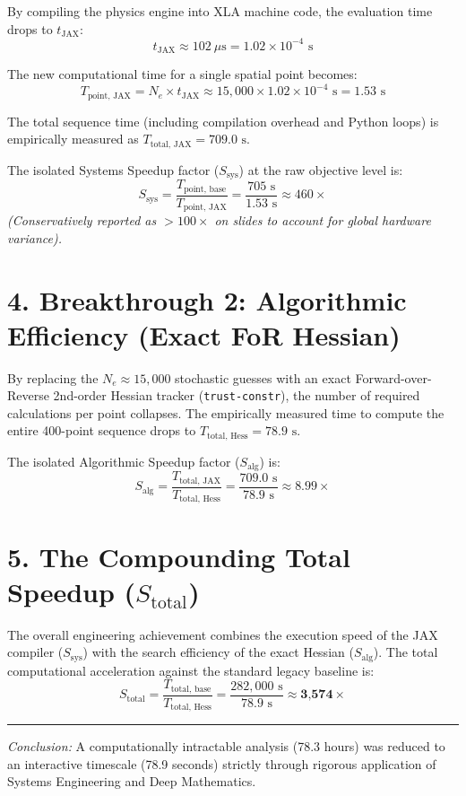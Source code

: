 \documentclass[11pt, letterpaper]{article}
\begin{document}
By compiling the physics engine into XLA machine code, the evaluation time drops to $t_{\text{JAX}}$:
\begin{equation}
t_{\text{JAX}} \approx 102 \ \mu\text{s} = 1.02 \times 10^{-4} \text{ s}
\end{equation}

The new computational time for a single spatial point becomes:
\begin{equation}
T_{\text{point, JAX}} = N_e \times t_{\text{JAX}} \approx 15,000 \times 1.02 \times 10^{-4} \text{ s} = 1.53 \text{ s}
\end{equation}

The total sequence time (including compilation overhead and Python loops) is empirically measured as $T_{\text{total, JAX}} = 709.0 \text{ s}$.

The isolated Systems Speedup factor ($S_{\text{sys}}$) at the raw objective level is:
\begin{equation}
S_{\text{sys}} = \frac{T_{\text{point, base}}}{T_{\text{point, JAX}}} = \frac{705 \text{ s}}{1.53 \text{ s}} \approx 460\times
\end{equation}
\textit{(Conservatively reported as $>100\times$ on slides to account for global hardware variance).}


\section*{4. Breakthrough 2: Algorithmic Efficiency (Exact FoR Hessian)}

By replacing the $N_e \approx 15,000$ stochastic guesses with an exact Forward-over-Reverse 2nd-order Hessian tracker (\texttt{trust-constr}), the number of required calculations per point collapses. The empirically measured time to compute the entire 400-point sequence drops to $T_{\text{total, Hess}} = 78.9 \text{ s}$.

The isolated Algorithmic Speedup factor ($S_{\text{alg}}$) is:
\begin{equation}
S_{\text{alg}} = \frac{T_{\text{total, JAX}}}{T_{\text{total, Hess}}} = \frac{709.0 \text{ s}}{78.9 \text{ s}} \approx 8.99\times
\end{equation}


\section*{5. The Compounding Total Speedup ($S_{\text{total}}$)}

The overall engineering achievement combines the execution speed of the JAX compiler ($S_{\text{sys}}$) with the search efficiency of the exact Hessian ($S_{\text{alg}}$). The total computational acceleration against the standard legacy baseline is:
\begin{equation}
S_{\text{total}} = \frac{T_{\text{total, base}}}{T_{\text{total, Hess}}} = \frac{282,000 \text{ s}}{78.9 \text{ s}} \approx \textbf{3,574}\times
\end{equation}

\vspace{0.5cm}
\hrule
\vspace{0.3cm}
\noindent \small \textit{Conclusion:} A computationally intractable analysis (78.3 hours) was reduced to an interactive timescale (78.9 seconds) strictly through rigorous application of Systems Engineering and Deep Mathematics.
\end{document}
